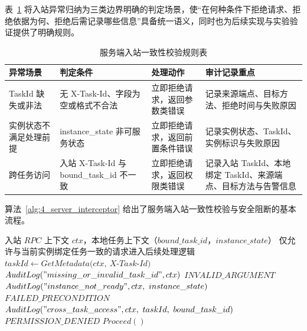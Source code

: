 \documentclass[lang=chs, degree=master, blindreview=true, winfonts=true, academic=false]{yanputhesis}
\begin{document}
表~\ref{tab:4_inbound_check_rules} 将入站异常归纳为三类边界明确的判定场景，使“在何种条件下拒绝请求、拒绝依据为何、拒绝后需记录哪些信息”具备统一语义，同时也为后续实现与实验验证提供了明确规则。
\begin{table}[!h]
    \centering
    \caption{服务端入站一致性校验规则表}
    \label{tab:4_inbound_check_rules}
    \begin{tabularx}{\textwidth}{>{\centering\arraybackslash}p{}
                                  >{\centering\arraybackslash}p{}
                                  >{\centering\arraybackslash}p{}
                                  >{\centering\arraybackslash}X}
        \toprule
        异常场景 & 判定条件 & 处理动作 & 审计记录重点 \\ \midrule
        TaskId 缺失或非法 & 无 X-Task-Id、字段为空或格式不合法 & 立即拒绝请求，返回参数类错误 & 记录来源端点、目标方法、拒绝时间与失败原因 \\
        实例状态不满足处理前提 & instance\_state 非可服务状态 & 立即拒绝请求，返回前置条件错误 & 记录实例状态、TaskId、实例标识与失败原因 \\
        跨任务访问 & 入站 X-Task-Id 与 bound\_task\_id 不一致 & 立即拒绝请求，返回权限类错误 & 记录入站 TaskId、本地绑定 TaskId、来源端点、目标方法与告警信息 \\
        \bottomrule
    \end{tabularx}
\end{table}

算法~\ref{alg:4_server_interceptor} 给出了服务端入站一致性校验与安全阻断的基本流程。
\begin{algorithm}[htbp]
    \caption{服务端入站一致性校验与安全阻断流程}
    \label{alg:4_server_interceptor}
    \begin{algorithmic}[1]
        \Require 入站 $RPC$ 上下文 $ctx$，本地任务上下文（$bound\_task\_id$，$instance\_state$）
        \Ensure 仅允许与当前实例绑定任务一致的请求进入后续处理逻辑
            \State $taskId \gets GetMetadata(ctx,\ X$-$Task$-$Id)$
                \State $AuditLog("missing\_or\_invalid\_task\_id", ctx)$
                \State \Return $INVALID\_ARGUMENT$
            \EndIf
                \State $AuditLog("instance\_not\_ready", ctx,\ instance\_state)$
                \State \Return $FAILED\_PRECONDITION$
            \EndIf
                \State $AuditLog("cross\_task\_access", ctx,\ taskId,\ bound\_task\_id)$
                \State \Return $PERMISSION\_DENIED$
            \EndIf
            \State \Return $Proceed()$
        \EndFunction
    \end{algorithmic}
\end{algorithm}
\end{document}
